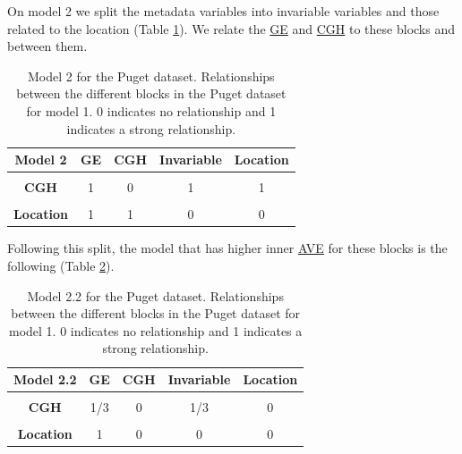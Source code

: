 \documentclass[
  12pt,
  a4paper,
  twoside,
  openright]{book}
\begin{document}
On model 2 we split the metadata variables into invariable variables and those related to the location (Table \ref{tab:puget-model2}).
We relate the \protect\hyperlink{acronyms_GE}{GE} and \protect\hyperlink{acronyms_CGH}{CGH} to these blocks and between them.

\begin{table}[H]

\caption[Model 2 for the Puget dataset.]{\label{tab:puget-model2}Model 2 for the Puget dataset. Relationships between the different blocks in the Puget dataset for model 1. 0 indicates no relationship and 1 indicates a strong relationship.}
\centering
\begin{tabular}[t]{>{}c|c|c|c|c}
\hline
\textbf{Model 2} & \textbf{GE} & \textbf{CGH} & \textbf{Invariable} & \textbf{Location}\\
\hline
\textbf{\cellcolor{gray!6}{GE}} & \cellcolor{gray!6}{0} & \cellcolor{gray!6}{1} & \cellcolor{gray!6}{1} & \cellcolor{gray!6}{1}\\
\hline
\textbf{CGH} & 1 & 0 & 1 & 1\\
\hline
\textbf{\cellcolor{gray!6}{Invariable}} & \cellcolor{gray!6}{1} & \cellcolor{gray!6}{1} & \cellcolor{gray!6}{0} & \cellcolor{gray!6}{0}\\
\hline
\textbf{Location} & 1 & 1 & 0 & 0\\
\hline
\end{tabular}
\end{table}

Following this split, the model that has higher inner \protect\hyperlink{acronyms_AVE}{AVE} for these blocks is the following (Table \ref{tab:puget-model2-2}).

\begin{table}[H]

\caption[Model 2.2 the for the Puget dataset.]{\label{tab:puget-model2-2}Model 2.2 for the Puget dataset. Relationships between the different blocks in the Puget dataset for model 1. 0 indicates no relationship and 1 indicates a strong relationship.}
\centering
\begin{tabular}[t]{>{}c|c|c|c|c}
\hline
\textbf{Model 2.2} & \textbf{GE} & \textbf{CGH} & \textbf{Invariable} & \textbf{Location}\\
\hline
\textbf{\cellcolor{gray!6}{GE}} & \cellcolor{gray!6}{0} & \cellcolor{gray!6}{1/3} & \cellcolor{gray!6}{0} & \cellcolor{gray!6}{1}\\
\hline
\textbf{CGH} & 1/3 & 0 & 1/3 & 0\\
\hline
\textbf{\cellcolor{gray!6}{Invariable}} & \cellcolor{gray!6}{0} & \cellcolor{gray!6}{1/3} & \cellcolor{gray!6}{0} & \cellcolor{gray!6}{0}\\
\hline
\textbf{Location} & 1 & 0 & 0 & 0\\
\hline
\end{tabular}
\end{table}
\end{document}
